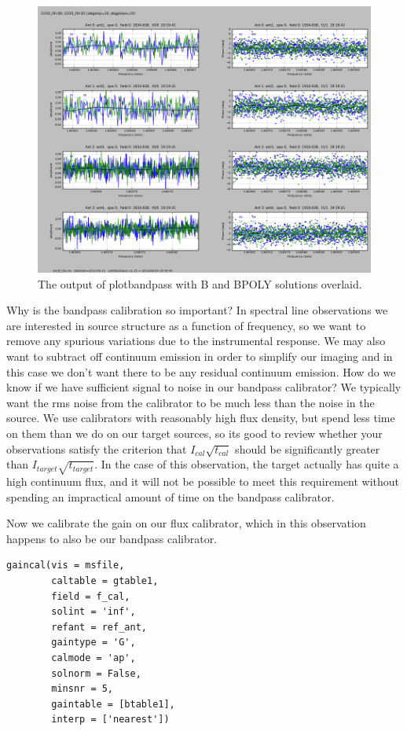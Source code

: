 \documentclass[force,almostfull,justified]{tufte-book}
\begin{document}
\begin{figure}
  \includegraphics[width=\textwidth]{images/plotbandpass_bpoly}
  \caption[]{The output of plotbandpass with B and BPOLY solutions overlaid.}
  \forceversofloat
  \label{fig:plotbandpass_bpoly}
\end{figure}

Why is the bandpass calibration so important?  In spectral line
observations we are interested in source structure as a function of
frequency, so we want to remove any spurious variations due to the
instrumental response. We may also want to subtract off continuum
emission in order to simplify our imaging and in this case we don't want
there to be any residual continuum emission. How do we know if we have
sufficient signal to noise in our bandpass calibrator?
We typically want the rms noise from the calibrator to be much less
than the noise in the source.  We use calibrators with reasonably high
flux density, but spend less time on them than we do on our target
sources, so its good to review whether your observations satisfy the
criterion that $I_{cal} \sqrt{t_{cal}}$ should be significantly
greater than $I_{target}\sqrt{t_{target}}$. In the case of this
observation, the target actually has quite a high continuum flux, and
it will not be possible to meet this requirement without spending an
impractical amount of time on the bandpass calibrator.

Now we calibrate the gain on our flux calibrator, which in this
observation happens to also be our bandpass calibrator.

\begin{casacmd}
\begin{verbatim}
gaincal(vis = msfile,
        caltable = gtable1,
        field = f_cal,
        solint = 'inf',
        refant = ref_ant,
        gaintype = 'G',
        calmode = 'ap',
        solnorm = False,
        minsnr = 5,
        gaintable = [btable1],
        interp = ['nearest'])
\end{verbatim}
\end{casacmd}
\end{document}
